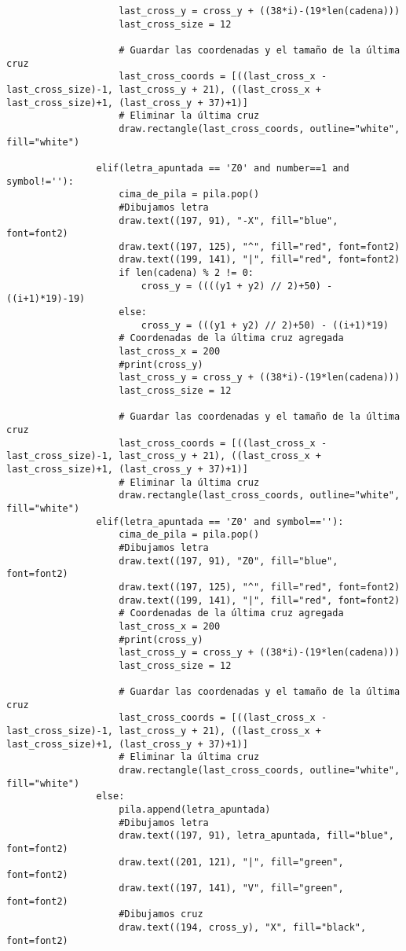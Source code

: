 \begin{lstlisting}
                    last_cross_y = cross_y + ((38*i)-(19*len(cadena)))
                    last_cross_size = 12

                    # Guardar las coordenadas y el tamaño de la última cruz
                    last_cross_coords = [((last_cross_x - last_cross_size)-1, last_cross_y + 21), ((last_cross_x + last_cross_size)+1, (last_cross_y + 37)+1)]
                    # Eliminar la última cruz
                    draw.rectangle(last_cross_coords, outline="white", fill="white")
                    
                elif(letra_apuntada == 'Z0' and number==1 and symbol!=''):
                    cima_de_pila = pila.pop()
                    #Dibujamos letra
                    draw.text((197, 91), "-X", fill="blue", font=font2)
                    draw.text((197, 125), "^", fill="red", font=font2)
                    draw.text((199, 141), "|", fill="red", font=font2)
                    if len(cadena) % 2 != 0:
                        cross_y = ((((y1 + y2) // 2)+50) - ((i+1)*19)-19)
                    else:
                        cross_y = (((y1 + y2) // 2)+50) - ((i+1)*19)
                    # Coordenadas de la última cruz agregada
                    last_cross_x = 200
                    #print(cross_y)
                    last_cross_y = cross_y + ((38*i)-(19*len(cadena)))
                    last_cross_size = 12

                    # Guardar las coordenadas y el tamaño de la última cruz
                    last_cross_coords = [((last_cross_x - last_cross_size)-1, last_cross_y + 21), ((last_cross_x + last_cross_size)+1, (last_cross_y + 37)+1)]
                    # Eliminar la última cruz
                    draw.rectangle(last_cross_coords, outline="white", fill="white")
                elif(letra_apuntada == 'Z0' and symbol==''):
                    cima_de_pila = pila.pop()
                    #Dibujamos letra
                    draw.text((197, 91), "Z0", fill="blue", font=font2)
                    draw.text((197, 125), "^", fill="red", font=font2)
                    draw.text((199, 141), "|", fill="red", font=font2)
                    # Coordenadas de la última cruz agregada
                    last_cross_x = 200
                    #print(cross_y)
                    last_cross_y = cross_y + ((38*i)-(19*len(cadena)))
                    last_cross_size = 12

                    # Guardar las coordenadas y el tamaño de la última cruz
                    last_cross_coords = [((last_cross_x - last_cross_size)-1, last_cross_y + 21), ((last_cross_x + last_cross_size)+1, (last_cross_y + 37)+1)]
                    # Eliminar la última cruz
                    draw.rectangle(last_cross_coords, outline="white", fill="white")
                else:
                    pila.append(letra_apuntada)
                    #Dibujamos letra
                    draw.text((197, 91), letra_apuntada, fill="blue", font=font2)
                    draw.text((201, 121), "|", fill="green", font=font2)
                    draw.text((197, 141), "V", fill="green", font=font2)
                    #Dibujamos cruz
                    draw.text((194, cross_y), "X", fill="black", font=font2)
                    

\end{lstlisting}
